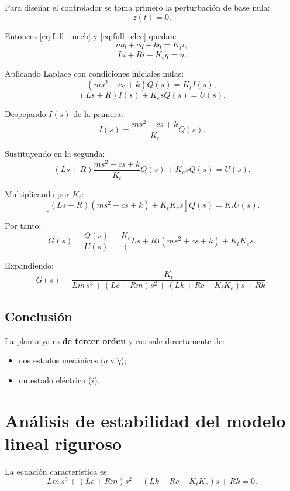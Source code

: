 \documentclass[11pt]{article}
\begin{document}
Para dise\~nar el controlador se toma primero la perturbaci\'on de base nula:
\[
z(t)=0.
\]

Entonces \eqref{eq:full_mech} y \eqref{eq:full_elec} quedan:
\begin{equation}
m\ddot{q} + c\dot{q} + kq = K_t i,
\label{eq:no_dist_mech}
\end{equation}
\begin{equation}
L\dot{i} + Ri + K_e\dot{q} = u.
\label{eq:no_dist_elec}
\end{equation}

Aplicando Laplace con condiciones iniciales nulas:
\[
(ms^2+cs+k)Q(s)=K_t I(s),
\]
\[
(Ls+R)I(s)+K_e s Q(s)=U(s).
\]

Despejando $I(s)$ de la primera:
\[
I(s)=\frac{ms^2+cs+k}{K_t}Q(s).
\]

Sustituyendo en la segunda:
\[
(Ls+R)\frac{ms^2+cs+k}{K_t}Q(s) + K_e s Q(s) = U(s).
\]

Multiplicando por $K_t$:
\[
\left[(Ls+R)(ms^2+cs+k)+K_tK_e s\right]Q(s)=K_tU(s).
\]

Por tanto:
\begin{equation}
G(s)=\frac{Q(s)}{U(s)}
=
\frac{K_t}
(Ls+R)(ms^2+cs+k)+K_tK_e s.
\label{eq:tf_exact}
\end{equation}

Expandiendo:
\begin{equation}
G(s)=\frac{K_t}
{Lm\,s^3 + (Lc+Rm)s^2 + (Lk+Rc+K_tK_e)s + Rk}.
\label{eq:tf_expanded}
\end{equation}

\subsection{Conclusi\'on}

La planta ya es \textbf{de tercer orden} y eso sale directamente de:

\begin{itemize}[leftmargin=1.2cm]
\item dos estados mec\'anicos ($q$ y $\dot q$);
\item un estado el\'ectrico ($i$).
\end{itemize}

\section{An\'alisis de estabilidad del modelo lineal riguroso}

La ecuaci\'on caracter\'istica es:
\[
Lm\,s^3 + (Lc+Rm)s^2 + (Lk+Rc+K_tK_e)s + Rk = 0.
\]
\end{document}
